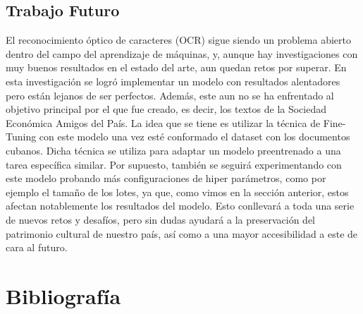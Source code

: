 \documentclass{article}
\begin{document}
\subsection{Trabajo Futuro}

El reconocimiento óptico de caracteres (OCR) sigue siendo un problema abierto dentro del campo del aprendizaje de máquinas, y, aunque hay investigaciones con muy buenos resultados en el estado del arte, aun quedan retos por superar. En esta investigación se logró implementar un modelo con resultados alentadores pero están lejanos de ser perfectos. Además, este aun no se ha enfrentado al objetivo principal por el que fue creado, es decir, los textos de la Sociedad Económica Amigos del País. La idea que se tiene es utilizar la técnica de Fine-Tuning con este modelo una vez esté conformado el dataset con los documentos cubanos. Dicha técnica se utiliza para adaptar un modelo preentrenado a una tarea específica similar. Por supuesto, también se seguirá experimentando con este modelo probando más configuraciones de hiper parámetros, como por ejemplo el tamaño de los lotes, ya que, como vimos en la sección anterior, estos afectan notablemente los resultados del modelo.  Esto conllevará a toda una serie de nuevos retos y desafíos, pero sin dudas ayudará a la preservación del patrimonio cultural de nuestro país, así como a una mayor accesibilidad a este de cara al futuro.
\newpage
\section{Bibliografía}
\medskip

\printbibliography
\end{document}
